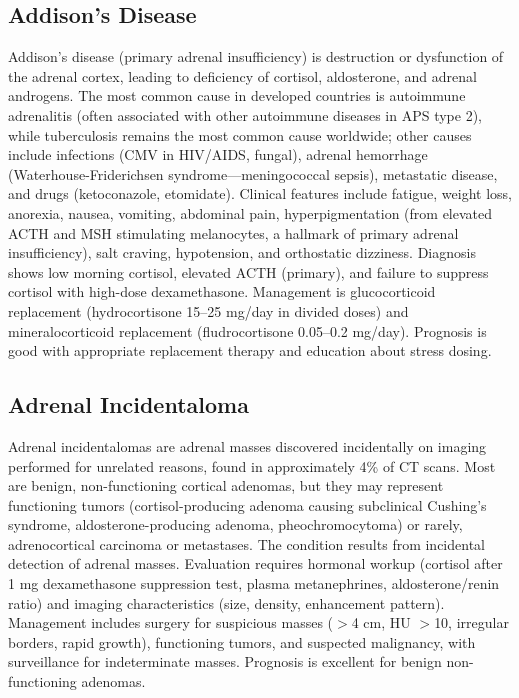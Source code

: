 \subsection{Addison's Disease}
\label{sec:Addison's Disease}
Addison's disease (primary adrenal insufficiency) is destruction or dysfunction of the adrenal cortex, leading to deficiency of cortisol, aldosterone, and adrenal androgens. The most common cause in developed countries is autoimmune adrenalitis (often associated with other autoimmune diseases in APS type 2), while tuberculosis remains the most common cause worldwide; other causes include infections (CMV in HIV/AIDS, fungal), adrenal hemorrhage (Waterhouse-Friderichsen syndrome---meningococcal sepsis), metastatic disease, and drugs (ketoconazole, etomidate). Clinical features include fatigue, weight loss, anorexia, nausea, vomiting, abdominal pain, hyperpigmentation (from elevated ACTH and MSH stimulating melanocytes, a hallmark of primary adrenal insufficiency), salt craving, hypotension, and orthostatic dizziness. Diagnosis shows low morning cortisol, elevated ACTH (primary), and failure to suppress cortisol with high-dose dexamethasone. Management is glucocorticoid replacement (hydrocortisone 15--25 mg/day in divided doses) and mineralocorticoid replacement (fludrocortisone 0.05--0.2 mg/day). Prognosis is good with appropriate replacement therapy and education about stress dosing.

\subsection{Adrenal Incidentaloma}
\label{sec:Adrenal Incidentaloma}
Adrenal incidentalomas are adrenal masses discovered incidentally on imaging performed for unrelated reasons, found in approximately 4\% of CT scans. Most are benign, non-functioning cortical adenomas, but they may represent functioning tumors (cortisol-producing adenoma causing subclinical Cushing's syndrome, aldosterone-producing adenoma, pheochromocytoma) or rarely, adrenocortical carcinoma or metastases. The condition results from incidental detection of adrenal masses. Evaluation requires hormonal workup (cortisol after 1 mg dexamethasone suppression test, plasma metanephrines, aldosterone/renin ratio) and imaging characteristics (size, density, enhancement pattern). Management includes surgery for suspicious masses ($>$4 cm, HU $>$10, irregular borders, rapid growth), functioning tumors, and suspected malignancy, with surveillance for indeterminate masses. Prognosis is excellent for benign non-functioning adenomas.


